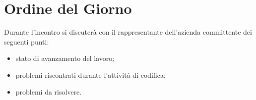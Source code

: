 \documentclass[../verbale-2017-04-20.tex]{subfiles}
\begin{document}
	
	\section{Ordine del Giorno}
	Durante l'incontro si discuterà con il rappresentante dell'azienda committente dei seguenti punti:
		\begin{itemize}
			\item stato di avanzamento del lavoro;
			\item problemi riscontrati durante l'attività di codifica;
			\item problemi da risolvere.
		\end{itemize}
	
\end{document}
